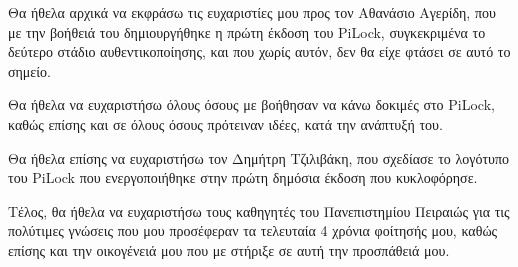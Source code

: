Θα ήθελα αρχικά να εκφράσω τις ευχαριστίες μου προς τον Αθανάσιο Αγερίδη, που με την βοήθειά του δημιουργήθηκε η πρώτη έκδοση του PiLock, συγκεκριμένα το δεύτερο στάδιο αυθεντικοποίησης, και που χωρίς αυτόν, δεν θα είχε φτάσει σε αυτό το σημείο. 

Θα ήθελα να ευχαριστήσω όλους όσους με βοήθησαν να κάνω δοκιμές στο PiLock, καθώς επίσης και σε όλους όσους πρότειναν ιδέες, κατά την ανάπτυξή του.

Θα ήθελα επίσης να ευχαριστήσω τον Δημήτρη Τζιλιβάκη, που σχεδίασε το λογότυπο του PiLock που ενεργοποιήθηκε στην πρώτη δημόσια έκδοση που κυκλοφόρησε.

Τέλος, θα ήθελα να ευχαριστήσω τους καθηγητές του Πανεπιστημίου Πειραιώς για τις πολύτιμες γνώσεις που μου προσέφεραν τα τελευταία 4 χρόνια φοίτησής μου, καθώς επίσης και την οικογένειά μου που με στήριξε σε αυτή την προσπάθειά μου.
